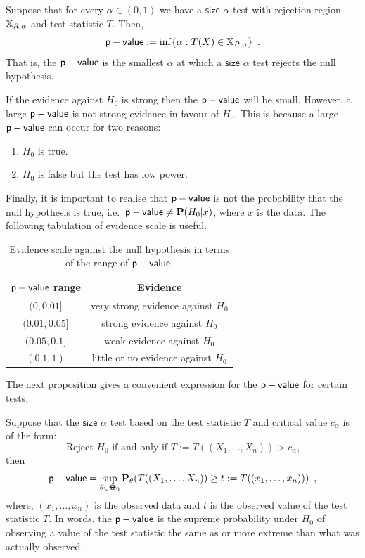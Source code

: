 \begin{definition}[p-value]
Suppose that for every $\alpha \in (0,1)$ we have a $\mathsf{size}$ $\alpha$ test with rejection region $\mathbb{X}_{R,\alpha}$ and test statistic $T$.  Then,
\[
\mathsf{p-value} := \inf \{ \alpha: T(X) \in \mathbb{X}_{R,\alpha} \} \enspace .
\]
That is, the $\mathsf{p-value}$ is the smallest $\alpha$ at which a $\mathsf{size}$ $\alpha$ test rejects the null hypothesis.
\end{definition}

If the evidence against $H_0$ is strong then the $\mathsf{p-value}$ will be small.  However, a large $\mathsf{p-value}$ is not strong evidence in favour of $H_0$.  This is because a large $\mathsf{p-value}$ can occur for two reasons:
\begin{enumerate}
\item $H_0$ is true.
\item $H_0$ is false but the test has low power.
\end{enumerate}
Finally, it is important to realise that $\mathsf{p-value}$ is not the probability that the null hypothesis is true, i.e.~$\mathsf{p-value} \neq \mathbf{P}(H_0|x)$, where $x$ is the data.  The following tabulation of evidence scale is useful.
\begin{table}
\caption{Evidence scale against the null hypothesis in terms of the range of $\mathsf{p-value}$.}\label{T:pvalueEvidenceScale}
\begin{center}
\begin{tabular}{|c|c|}
\hline
$\mathsf{p-value}$ range & Evidence \\ \hline
$(0, 0.01]$ & very strong evidence against $H_0$\\
$(0.01, 0.05]$ & strong evidence against $H_0$\\
$(0.05, 0.1]$ & weak evidence against $H_0$\\
$(0.1,1)$ & little or no evidence against $H_0$\\
\hline
\end{tabular}
\end{center} 
\end{table}
The next proposition gives a convenient expression for the $\mathsf{p-value}$ for certain tests.
\begin{prop}
Suppose that the $\mathsf{size}$ $\alpha$ test based on the test statistic $T$ and critical value $c_{\alpha}$ is of the form:
\[
\text{Reject $H_0$ if and only if $T:=T((X_1,\ldots,X_n))> c_{\alpha}$,}
\]
then
\[
\mathsf{p-value} = \sup_{\theta \in {\Theta}\mspace{-11 mu}{\Theta}_0} \mathbf{P}_{\theta}(T((X_1,\ldots,X_n)) \geq t:=T((x_1,\ldots,x_n))) \enspace ,
\]
where, $(x_1,\ldots,x_n)$ is the observed data and $t$ is the observed value of the test statistic $T$.  In words, the $\mathsf{p-value}$ is the supreme probability under $H_0$ of observing a value of the test statistic the same as or more extreme than what was actually observed.
\end{prop}
